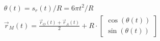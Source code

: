 \begin{enumerate}
\begin{enumerate}
                    \begin{answer}
                        \begin{align}
                            \theta(t) = s_r(t) / R = 6 \pi t^2 / R \\
                            \vec{r}_{M}(t) = \frac{\vec{r}_{O}(t) + \vec{r}_{A}(t)}{2} + R \cdot \begin{bmatrix}
                                \cos(\theta(t)) \\
                                \sin(\theta(t))
                            \end{bmatrix}
                        \end{align}
                    \end{answer}
          \end{enumerate}


\end{enumerate}
